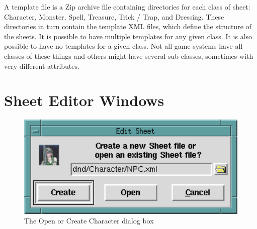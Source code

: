 A template file is a Zip archive file containing directories for each
class of sheet: Character, Monster, Spell, Treasure, Trick / Trap, and
Dressing.  These directories in turn contain the template XML files,
which define the structure of the sheets.  It is possible to have
multiple templates for any given class.  It is also possible to have no
templates for a given class.  Not all game systems have all classes of
these things and others might have several sub-classes, sometimes with
very different attributes.

\section{Sheet Editor Windows}
\label{SheetEditor}

\begin{figure}[hbpt]
\begin{centering}
\includegraphics[width=5in]{CreateOrOpenChar.png}
\caption{The Open or Create Character dialog box}
\label{fig:opencreatechar}
\end{centering}
\end{figure}
